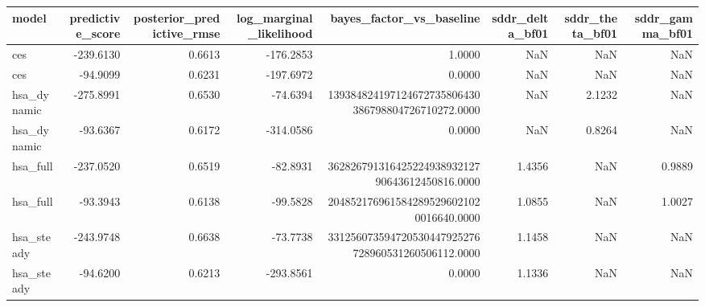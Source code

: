 \begin{tabular}{lrrrrrrr}
\toprule
model & predictive\_score & posterior\_predictive\_rmse & log\_marginal\_likelihood & bayes\_factor\_vs\_baseline & sddr\_delta\_bf01 & sddr\_theta\_bf01 & sddr\_gamma\_bf01 \\
\midrule
ces & -239.6130 & 0.6613 & -176.2853 & 1.0000 & NaN & NaN & NaN \\
ces & -94.9099 & 0.6231 & -197.6972 & 0.0000 & NaN & NaN & NaN \\
hsa\_dynamic & -275.8991 & 0.6530 & -74.6394 & 139384824197124672735806430386798804726710272.0000 & NaN & 2.1232 & NaN \\
hsa\_dynamic & -93.6367 & 0.6172 & -314.0586 & 0.0000 & NaN & 0.8264 & NaN \\
hsa\_full & -237.0520 & 0.6519 & -82.8931 & 36282679131642522493893212790643612450816.0000 & 1.4356 & NaN & 0.9889 \\
hsa\_full & -93.3943 & 0.6138 & -99.5828 & 2048521769615842895296021020016640.0000 & 1.0855 & NaN & 1.0027 \\
hsa\_steady & -243.9748 & 0.6638 & -73.7738 & 331256073594720530447925276728960531260506112.0000 & 1.1458 & NaN & NaN \\
hsa\_steady & -94.6200 & 0.6213 & -293.8561 & 0.0000 & 1.1336 & NaN & NaN \\
\bottomrule
\end{tabular}
